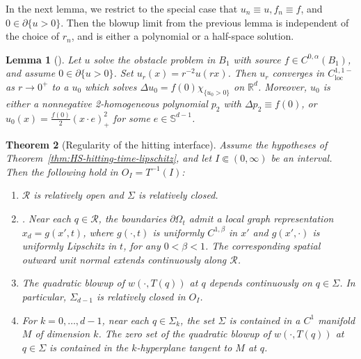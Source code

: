 \documentclass[11pt]{amsart}
\numberwithin{equation}{section}
\numberwithin{figure}{section}
\theoremstyle{plain}
\newtheorem{thm}{Theorem}[section]
\newtheorem{lem}[thm]{Lemma}
\theoremstyle{definition}
\theoremstyle{remark}
\theoremstyle{plain}
\def\R{\mathbb{R}}
\begin{document}
In the next lemma, we restrict to the special case that $u_n\equiv u, f_n\equiv f$, and $0\in \partial \{ u > 0\}$. Then the blowup limit from the previous lemma is independent of the choice of $r_n$, and is either a polynomial or a half-space solution.

\begin{lem}[{\cite[Theorem 7, Theorem 8]{Caffarelli98}}]\label{lem:stationary-blowup}
Let $u$ solve the obstacle problem in $B_1$ with source $f\in C^{0,\alpha}(B_1)$, and assume $0\in \partial \{u > 0\}$. Set $u_r(x) = r^{-2}u(rx)$. Then $u_r$ converges in $C^{1,1-}_{\mathrm{loc}}$ as $r\to 0^+$ to a $u_0$ which solves $\Delta u_0 = f(0)\chi_{\{ u_0 > 0\}}$ on $\R^d$. Moreover, $u_0$ is either a nonnegative 2-homogeneous polynomial $p_2$ with $\Delta p_2 \equiv f(0)$, or $u_0(x) = \frac{f(0)}{2}(x\cdot e)_+^2$ for some $e\in \mathbb{S}^{d-1}$.
\end{lem}
\begin{thm}[Regularity of the hitting interface]
\label{thm:hitting-interface-regularity}
Assume the hypotheses of Theorem~\ref{thm:HS-hitting-time-lipschitz}, and let $I\Subset(0,\infty)$ be an interval.  Then the following hold in \(O_I=T^{-1}(I)\):
\begin{enumerate}[label=(\roman*)]
\item \cite[Props 5.4]{CJK25}
\(\mathcal R\) is relatively open and \(\Sigma\) is relatively closed.
\item \cite[Prop 5.6 and App.~6]{CJK25}. Near each \(q\in\mathcal R\), the boundaries $\partial\Omega_t$ admit a local graph representation $x_d=g(x',t)$, where $g(\cdot,t)$ is uniformly $C^{1,\beta}$ in $x'$ and $g(x',\cdot)$ is uniformly Lipschitz in $t$, for any $0<\beta<1$. The corresponding spatial outward unit normal extends continuously along \(\mathcal R\).
\item \cite[Props 5.13]{CJK25} The quadratic blowup of \(w(\cdot,T(q))\) at $q$ depends continuously on $q\in\Sigma$.
In particular, \(\Sigma_{d-1}\) is relatively closed in \(O_I\).
\item\label{i:singular-set-c1-manifold} \cite[Prop 5.15]{CJK25} For $k=0,\ldots,d-1$, near each \(q\in\Sigma_k\), the set \(\Sigma\) is contained in a
\(C^1\) manifold $M$ of dimension \(k\). The zero set of the quadratic blowup of $w(\cdot, T(q))$ at $q\in \Sigma$ is contained in the $k$-hyperplane tangent to $M$ at $q$.
\end{enumerate}

\end{thm}
\end{document}
